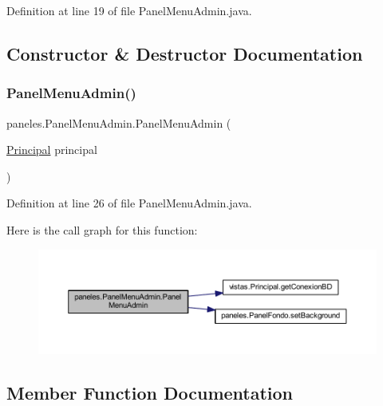 Definition at line 19 of file Panel\+Menu\+Admin.\+java.



\subsection{Constructor \& Destructor Documentation}
\mbox{\label{classpaneles_1_1_panel_menu_admin_ae686f35c694b90e334b64c385aa959ee}} 
\subsubsection{\texorpdfstring{Panel\+Menu\+Admin()}{PanelMenuAdmin()}}
{\footnotesize\ttfamily paneles.\+Panel\+Menu\+Admin.\+Panel\+Menu\+Admin (\begin{DoxyParamCaption}\item[{\mbox{\hyperlink{classvistas_1_1_principal}{Principal}}}]{principal }\end{DoxyParamCaption})}



Definition at line 26 of file Panel\+Menu\+Admin.\+java.

Here is the call graph for this function\+:
\nopagebreak
\begin{figure}[H]
\begin{center}
\leavevmode
\includegraphics[width=350pt]{classpaneles_1_1_panel_menu_admin_ae686f35c694b90e334b64c385aa959ee_cgraph}
\end{center}
\end{figure}


\subsection{Member Function Documentation}
\mbox{\label{classpaneles_1_1_panel_menu_admin_a45a3165ede4cd4e1d926a7d07cedc8a1}} 
